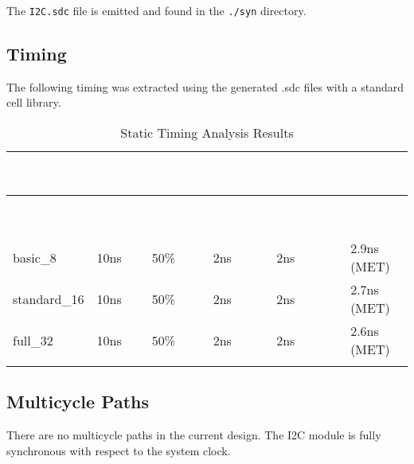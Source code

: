 The \texttt{I2C.sdc} file is emitted and found in the \texttt{./syn} directory.

\subsection{Timing}
The following timing was extracted using the generated .sdc files with a standard cell library.

\renewcommand*{\arraystretch}{1.4}
\begin{longtable}[H]{
    | p{}
    | p{}
    | p{}
    | p{}
    | p{}
    | p{} |
  }
  \hline
  \rowcolor{black}
  \textcolor{white}{\textbf{Config}} &
  \textcolor{white}{\textbf{Period}} &
  \textcolor{white}{\textbf{Duty Cycle}} &
  \textcolor{white}{\textbf{Input Delay}} &
  \textcolor{white}{\textbf{Output Delay}} &
  \textcolor{white}{\textbf{Slack}} \\ 
  \hline \hline
  \endfirsthead

  \rowcolor{black}
  \textcolor{white}{\textbf{Config}} &
  \textcolor{white}{\textbf{Period}} &
  \textcolor{white}{\textbf{Duty Cycle}} &
  \textcolor{white}{\textbf{Input Delay}} &
  \textcolor{white}{\textbf{Output Delay}} &
  \textcolor{white}{\textbf{Slack}} \\ 
  \hline \hline
  \endhead

  \hline
  \endfoot

basic\_8 &
10ns &
50\% &
2ns &
2ns &
2.9ns (MET) \\ \hline

standard\_16 &
10ns &
50\% &
2ns &
2ns &
2.7ns (MET) \\ \hline

full\_32 &
10ns &
50\% &
2ns &
2ns &
2.6ns (MET) \\ \hline

\caption{Static Timing Analysis Results}
\label{table:timing}
\end{longtable}

\subsection{Multicycle Paths}
There are no multicycle paths in the current design. The I2C module is fully synchronous with respect to the system clock.